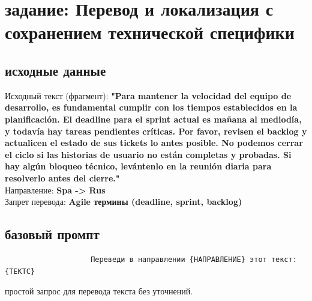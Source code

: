 \section{задание: Перевод и локализация с сохранением технической специфики}
\subsection{исходные данные}
\indent Исходный текст (фрагмент): \textbf{"Para mantener la velocidad del equipo de desarrollo, es fundamental cumplir con los tiempos establecidos en la planificación. El deadline para el sprint actual es mañana al mediodía, y todavía hay tareas pendientes críticas. Por favor, revisen el backlog y actualicen el estado de sus tickets lo antes posible. No podemos cerrar el ciclo si las historias de usuario no están completas y probadas. Si hay algún bloqueo técnico, levántenlo en la reunión diaria para resolverlo antes del cierre."} \\
\indent Направление: \textbf{Spa -> Rus} \\
\indent Запрет перевода: \textbf{Agile термины (deadline, sprint, backlog)} \\
\newline
\subsection{базовый промпт}
\begin{verbatim}
					Переведи в направлении {НАПРАВЛЕНИЕ} этот текст: {ТЕКТС}
\end{verbatim}
простой запрос для перевода текста без уточнений.
\newpage
